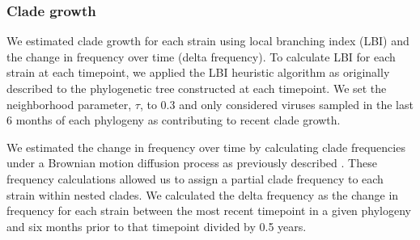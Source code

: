 \documentclass[9pt,lineno]{elife} %
\providecommand{\DIFaddbegin}{} %
\providecommand{\DIFaddend}{} %
\providecommand{\DIFdelbegin}{} %
\providecommand{\DIFdelend}{} %
\providecommand{\DIFaddbegin}{} %
\providecommand{\DIFaddend}{} %
\providecommand{\DIFdelbegin}{} %
\providecommand{\DIFdelend}{} %
\newcommand{\DIFscaledelfig}{0.5}
\newlength{\DIFdelgraphicswidth} %
\newlength{\DIFdelgraphicsheight} %
\newcommand{\DIFaddincludegraphics}[2][]{{\color{blue}\fbox{\DIFOincludegraphics[#1]{#2}}}} %
\newcommand{\DIFdelincludegraphics}[2][]{%
\sbox{\DIFdelgraphicsbox}{\DIFOincludegraphics[#1]{#2}}%
\settoboxwidth{\DIFdelgraphicswidth}{\DIFdelgraphicsbox} %
\settoboxtotalheight{\DIFdelgraphicsheight}{\DIFdelgraphicsbox} %
\scalebox{\DIFscaledelfig}{%
\parbox[b]{\DIFdelgraphicswidth}{\usebox{\DIFdelgraphicsbox}\\[-\baselineskip] \rule{\DIFdelgraphicswidth}{0em}}\llap{\resizebox{\DIFdelgraphicswidth}{\DIFdelgraphicsheight}{%
\setlength{\unitlength}{\DIFdelgraphicswidth}%
\begin{picture}(1,1)%
\thicklines\linethickness{2pt} %
{\color[rgb]{1,0,0}\put(0,0){\framebox(1,1){}}}%
{\color[rgb]{1,0,0}\put(0,0){\line( 1,1){1}}}%
{\color[rgb]{1,0,0}\put(0,1){\line(1,-1){1}}}%
\end{picture}%
}\hspace*{3pt}}} %
} %
\DeclareRobustCommand{\DIFaddbegin}{\DIFOaddbegin \let\includegraphics\DIFaddincludegraphics} %
\DeclareRobustCommand{\DIFaddend}{\DIFOaddend \let\includegraphics\DIFOincludegraphics} %
\DeclareRobustCommand{\DIFdelbegin}{\DIFOdelbegin \let\includegraphics\DIFdelincludegraphics} %
\DeclareRobustCommand{\DIFdelend}{\DIFOaddend \let\includegraphics\DIFOincludegraphics} %
\begin{document}
\subsubsection*{Clade growth}

We estimated clade growth for each strain using local branching index (LBI) and the change in frequency over time (delta frequency).
To calculate LBI for each strain at each timepoint, we applied the LBI heuristic algorithm as originally described \DIFdelbegin %
\DIFdelend \DIFaddbegin \citep{Neher:2014eu} \DIFaddend to the phylogenetic tree constructed at each timepoint.
We set the neighborhood parameter, $\tau$, to 0.3 and only considered viruses sampled in the last 6 months of each phylogeny as contributing to recent clade growth.

We estimated the change in frequency over time by calculating clade frequencies under a Brownian motion diffusion process as previously described \DIFdelbegin %
\DIFdelend \DIFaddbegin \citep{Lee2018}\DIFaddend .
These frequency calculations allowed us to assign a partial clade frequency to each strain within nested clades.
We calculated the delta frequency as the change in frequency for each strain between the most recent timepoint in a given phylogeny and six months prior to that timepoint divided by 0.5 years.
\end{document}
